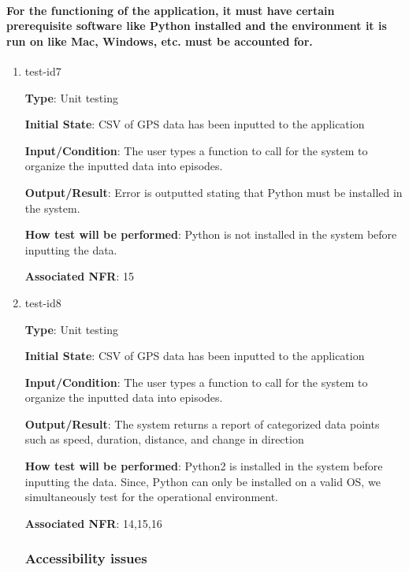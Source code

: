 \documentclass[12pt, titlepage]{article}
\begin{document}
\paragraph{For the functioning of the application, it must have certain prerequisite software like Python installed and the environment it is run on like Mac, Windows, etc. must be accounted for.}

\begin{enumerate}

\item{test-id7\\}

\textbf{Type}: Unit testing
					
\textbf{Initial State}: CSV of GPS data has been inputted to the application
					
\textbf{Input/Condition}: The user types a function to call for the system to organize the
inputted data into episodes. 
					
\textbf{Output/Result}: Error is outputted stating that Python must be installed in the system.
					
\textbf{How test will be performed}: Python is not installed in the system before inputting the data. 

\textbf{Associated NFR}: 15

\item{test-id8\\}

\textbf{Type}: Unit testing
					
\textbf{Initial State}: CSV of GPS data has been inputted to the application
					
\textbf{Input/Condition}: The user types a function to call for the system to organize the
inputted data into episodes. 
					
\textbf{Output/Result}: The system returns a report of categorized data points such
as speed, duration, distance, and change in direction
					
\textbf{How test will be performed}: Python2 is installed in the system before inputting the data. Since, Python can only be installed on a valid OS, we simultaneously test for the operational environment.

\textbf{Associated NFR}: 14,15,16

\subsubsection{Accessibility issues}


\end{enumerate}
\end{document}

